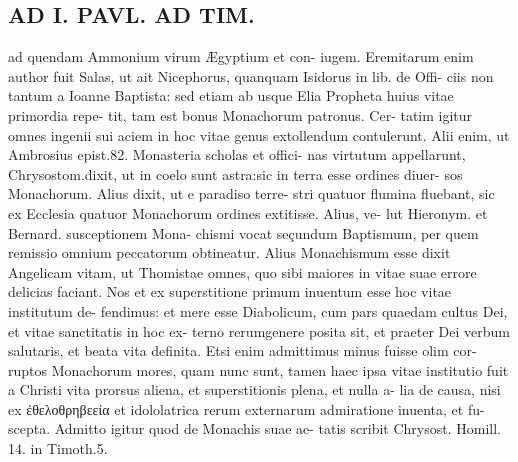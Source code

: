 \documentclass{article}
\begin{document}
\begin{pages}
\section*{AD I. PAVL. AD TIM. }
\marginpar{[ p.216 ]}ad quendam Ammonium virum Ægyptium et con- iugem. Eremitarum enim author fuit Salas, ut ait Nicephorus, quanquam Isidorus in lib. de Offi- ciis non tantum a Ioanne Baptista: sed etiam ab usque Elia Propheta huius vitae primordia repe- tit, tam est bonus Monachorum patronus. Cer- tatim igitur omnes ingenii sui aciem in hoc vitae genus extollendum contulerunt. Alii enim, ut Ambrosius epist.82. Monasteria scholas et offici- nas virtutum appellarunt, Chrysostom.dixit, ut in coelo sunt astra:sic in terra esse ordines diuer- sos Monachorum. Alius dixit, ut e paradiso terre- stri quatuor flumina fluebant, sic ex Ecclesia quatuor Monachorum ordines extitisse. Alius, ve- lut Hieronym. et Bernard. susceptionem Mona- chismi vocat seçundum Baptismum, per quem remissio omnium peccatorum obtineatur. Alius Monachismum esse dixit Angelicam vitam, ut Thomistae omnes, quo sibi maiores in vitae suae errore delicias faciant. Nos et ex superstitione primum inuentum esse hoc vitae institutum de- fendimus: et mere esse Diabolicum, cum pars quaedam cultus Dei, et vitae sanctitatis in hoc ex- terno rerumgenere posita sit, et praeter Dei verbum salutaris, et beata vita definita. Etsi enim admittimus minus fuisse olim cor- ruptos Monachorum mores, quam nunc sunt, tamen haec ipsa vitae institutio fuit a Christi vita prorsus aliena, et superstitionis plena, et nulla a- lia de causa, nisi ex ἐθελοθρηβεεία et idololatrica rerum externarum admiratione inuenta, et fu- scepta. Admitto igitur quod de Monachis suae ae- tatis scribit Chrysost. Homill. 14. in Timoth.5. 

\end{pages}
\end{document}
